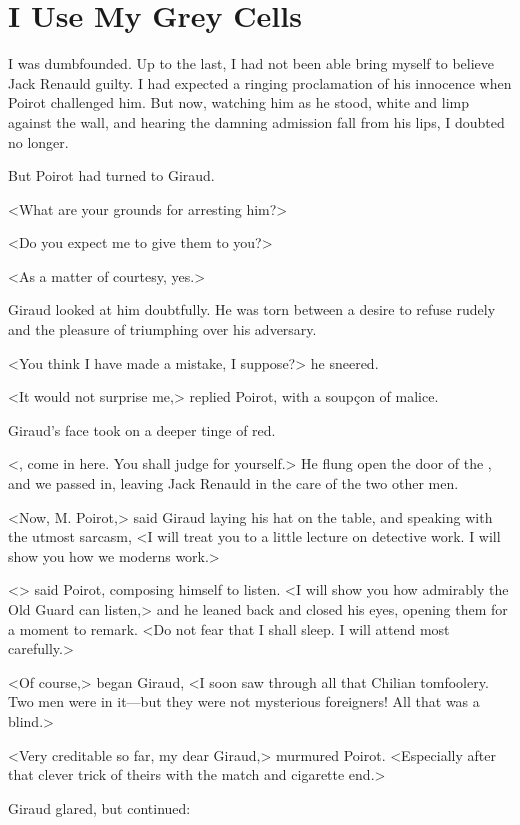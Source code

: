 \chapter{I Use My Grey Cells}

\lettrine{I}{} was dumbfounded. Up to the last, I had not been able bring myself to believe Jack Renauld guilty. I had expected a ringing proclamation of his innocence when Poirot challenged him. But now, watching him as he stood, white and limp against the wall, and hearing the damning admission fall from his lips, I doubted no longer. 

 But Poirot had turned to Giraud. 

 <What are your grounds for arresting him?> 

 <Do you expect me to give them to you?> 

 <As a matter of courtesy, yes.> 

 Giraud looked at him doubtfully. He was torn between a desire to refuse rudely and the pleasure of triumphing over his adversary. 

 <You think I have made a mistake, I suppose?> he sneered. 

 <It would not surprise me,> replied Poirot, with a soupçon of malice. 

 Giraud's face took on a deeper tinge of red. 

 <, come in here. You shall judge for yourself.> He flung open the door of the , and we passed in, leaving Jack Renauld in the care of the two other men. 

 <Now, M. Poirot,> said Giraud laying his hat on the table, and speaking with the utmost sarcasm, <I will treat you to a little lecture on detective work. I will show you how we moderns work.> 

 <> said Poirot, composing himself to listen. <I will show you how admirably the Old Guard can listen,> and he leaned back and closed his eyes, opening them for a moment to remark. <Do not fear that I shall sleep. I will attend most carefully.> 

 <Of course,> began Giraud, <I soon saw through all that Chilian tomfoolery. Two men were in it—but they were not mysterious foreigners! All that was a blind.> 

 <Very creditable so far, my dear Giraud,> murmured Poirot. <Especially after that clever trick of theirs with the match and cigarette end.> 

 Giraud glared, but continued: 

